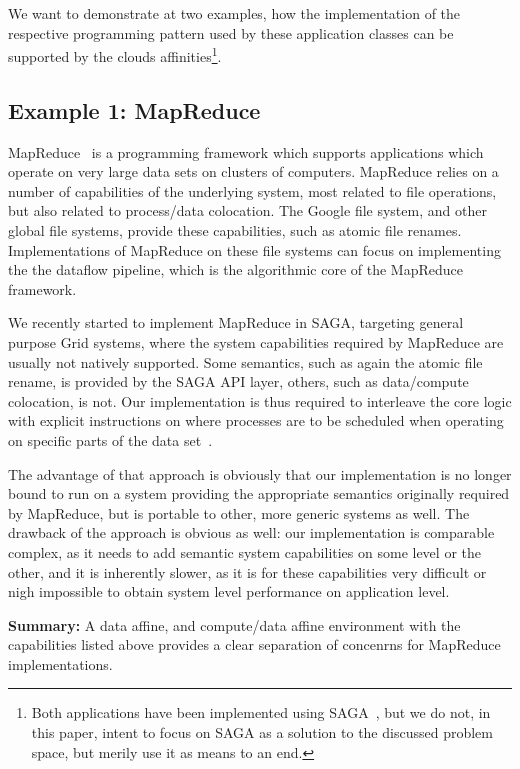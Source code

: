 \documentclass{article}
\newcommand{\B}[1]{\textbf{#1}}
\begin{document}
 We want to demonstrate at two examples, how the implementation of the
 respective programming pattern used by these application classes can
 be supported by the clouds affinities\footnote{Both applications have
 been implemented using SAGA~\cite{saga-core}, but we do not, in this
 paper, intent to focus on SAGA as a solution to the discussed problem
 space, but merily use it as means to an end.}.

 \subsection{Example 1: MapReduce}

  MapReduce~\cite{mapreduce-paper} is a programming framework which supports
  applications which operate on very large data sets on clusters of
  computers.  MapReduce relies on a number of capabilities of the
  underlying system, most related to file operations, but also related
  to process/data colocation.  The Google file system, and other
  global file systems, provide these capabilities, such as atomic file
  renames.  Implementations of MapReduce on these file systems can
  focus on implementing the the dataflow pipeline, which is the
  algorithmic core of the MapReduce framework.

  We recently started to implement MapReduce in SAGA, targeting
  general purpose Grid systems, where the system capabilities required
  by MapReduce are usually not natively supported.  Some semantics,
  such as again the atomic file rename, is provided by the SAGA API
  layer, others, such as data/compute colocation, is not.  Our
  implementation is thus required to interleave the core logic with
  explicit instructions on where processes are to be scheduled when
  operating on specific parts of the data set~\cite{gsoc-saga}.

  The advantage of that approach is obviously that our implementation
  is no longer bound to run on a system providing the appropriate
  semantics originally required by MapReduce, but is portable to
  other, more generic systems as well.  The drawback of the approach
  is obvious as well: our implementation is comparable complex, as it
  needs to add semantic system capabilities on some level or the
  other, and it is inherently slower, as it is for these capabilities
  very difficult or nigh impossible to obtain system level performance
  on application level.

  \B{Summary:} A data affine, and compute/data affine environment with
  the capabilities listed above provides a clear separation of
  concenrns for MapReduce implementations.
\end{document}
